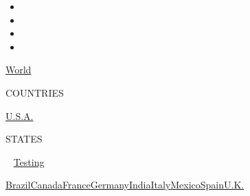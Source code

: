 \begin{itemize}
\item
\item
\item
\item
\end{itemize}

\href{https://www.nytimes3xbfgragh.onion/interactive/2020/world/coronavirus-maps.html}{World}~

COUNTRIES

\textbar{}
\href{https://www.nytimes3xbfgragh.onion/interactive/2020/us/coronavirus-us-cases.html}{U.S.A.}~

STATES

~
\href{https://www.nytimes3xbfgragh.onion/interactive/2020/us/coronavirus-testing.html}{Testing}

\href{https://www.nytimes3xbfgragh.onion/interactive/2020/world/americas/brazil-coronavirus-cases.html}{Brazil}\href{https://www.nytimes3xbfgragh.onion/interactive/2020/world/canada/canada-coronavirus-cases.html}{Canada}\href{https://www.nytimes3xbfgragh.onion/interactive/2020/world/europe/france-coronavirus-cases.html}{France}\href{https://www.nytimes3xbfgragh.onion/interactive/2020/world/europe/germany-coronavirus-cases.html}{Germany}\href{https://www.nytimes3xbfgragh.onion/interactive/2020/world/asia/india-coronavirus-cases.html}{India}\href{https://www.nytimes3xbfgragh.onion/interactive/2020/world/europe/italy-coronavirus-cases.html}{Italy}\href{https://www.nytimes3xbfgragh.onion/interactive/2020/world/americas/mexico-coronavirus-cases.html}{Mexico}\href{https://www.nytimes3xbfgragh.onion/interactive/2020/world/europe/spain-coronavirus-cases.html}{Spain}\href{https://www.nytimes3xbfgragh.onion/interactive/2020/world/europe/united-kingdom-coronavirus-cases.html}{U.K.}

